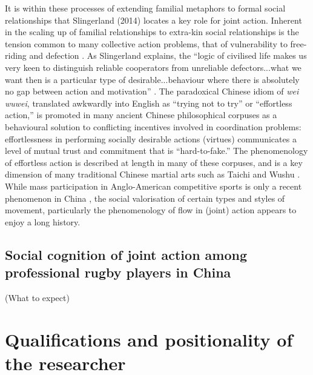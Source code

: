 {  It is within these processes of extending familial metaphors to formal social relationships that Slingerland (2014) locates a key role for joint action. Inherent in the scaling up of familial relationships to extra-kin social relationships is the tension common to many collective action problems, that of vulnerability to free-riding and defection \citep{Cosmides2013,Gavrilets2015}.
  As Slingerland explains, the ``logic of civilised life makes us very keen to distinguish reliable cooperators from unreliable defectors...what we want then is a particular type of desirable...behaviour where there is absolutely no gap between action and motivation'' \citep[192]{Slingerland2014}. The paradoxical Chinese idiom of \textit{wei wuwei}, translated awkwardly into English as ``trying not to try'' or ``effortless action,'' is promoted in many ancient Chinese philosophical corpuses as a behavioural solution to conflicting incentives involved in coordination problems: effortlessness in performing socially desirable actions (virtues) communicates a level of mutual trust and commitment that is ``hard-to-fake.''  The phenomenology of effortless action is described at length in many of these corpuses, and is a key dimension of many traditional Chinese martial arts such as Taichi and Wushu \citep{Morris1998}.
  While mass participation in Anglo-American competitive sports is only a recent phenomenon in China \citep{Brownell2008}, the social valorisation of certain types and styles of movement, particularly the phenomenology of flow in (joint) action appears to enjoy a long history.




\subsection{Social cognition of joint action among professional rugby players in China }



(What to expect)








\section{Qualifications and positionality of the researcher}

}
